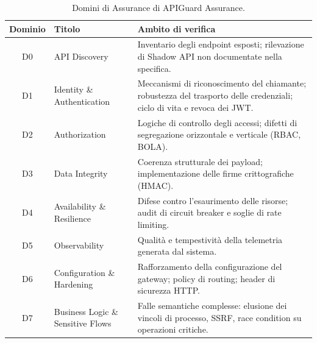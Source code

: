 \begin{table}[ht]
  \centering
  \small
  \begin{tabularx}{\textwidth}{@{} c l >{\raggedright\arraybackslash}X @{}}
    \toprule
    \textbf{Dominio} & \textbf{Titolo}                   & \textbf{Ambito di verifica}                                                                                                   \\
    \midrule
    D0               & API Discovery                     & Inventario degli endpoint esposti; rilevazione di Shadow API non documentate nella specifica.                                 \\
    \addlinespace
    D1               & Identity \& Authentication        & Meccanismi di riconoscimento del chiamante; robustezza del trasporto delle credenziali; ciclo di vita e revoca dei \gls{JWT}. \\
    \addlinespace
    D2               & Authorization                     & Logiche di controllo degli accessi; difetti di segregazione orizzontale e verticale (\gls{RBAC}, \gls{BOLA}).                 \\
    \addlinespace
    D3               & Data Integrity                    & Coerenza strutturale dei payload; implementazione delle firme crittografiche (\gls{HMAC}).                                    \\
    \addlinespace
    D4               & Availability \& Resilience        & Difese contro l'esaurimento delle risorse; audit di circuit breaker e soglie di rate limiting.                                \\
    \addlinespace
    D5               & Observability                     & Qualità e tempestività della telemetria generata dal sistema.                                                                 \\
    \addlinespace
    D6               & Configuration \& Hardening        & Rafforzamento della configurazione del gateway; policy di routing; header di sicurezza \gls{HTTP}.                            \\
    \addlinespace
    D7               & Business Logic \& Sensitive Flows & Falle semantiche complesse: elusione dei vincoli di processo, \gls{SSRF}, race condition su operazioni critiche.              \\
    \bottomrule
  \end{tabularx}
  \caption{Domini di Assurance di APIGuard Assurance.}
  \label{tab:domini}
\end{table}